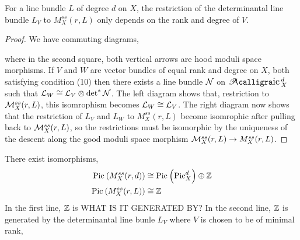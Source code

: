 \documentclass[12pt]{article}
\begin{document}
\begin{cor}
For a line bundle $L$ of degree $d$ on $X$, the restriction of the determinantal line bundle $L_V$ to $M_X^{ss}(r, L)$ only depends on the rank and degree of $V$.
\end{cor}

\begin{proof}
We have commuting diagrams,
\begin{center}
\quad {} \quad
{}
\end{center}
where in the second square, both vertical arrows are hood moduli space morphisms. If $V$ and $W$ are vector bundles of equal rank and degree on $X$, both satisfying condition (10) then there exists a line bundle $\mathcal{N}$ on $\cPic^d_X$ such that $\mathcal{L}_W \cong \mathcal{L}_V \otimes \det\nolimits^{*} \mathcal{N}$. The left diagram shows that, restriction to $\mathcal{M}_X^{ss}(r,L)$, this isomrophism becomes $\mathcal{L}_W \cong \mathcal{L}_V$. The right diagram now shows that the restriction of $L_V$ and $L_W$ to $M_X^{ss}(r, L)$ become isomrophic after pulling back to $\mathcal{M}_X^{ss}(r, L)$, so the restrictions must be isomorphic by the uniqueness of the descent along the good moduli space morphism $\mathcal{M}_X^{ss}(r, L) \to M_X^{ss}(r, L)$.
\end{proof}

\begin{theorem}
There exist isomorphisms,
\begin{align*}
\mathrm{Pic}^{} \left( M_X^{ss}(r,d) \right) & \cong \mathrm{Pic}^{} \left( \mathrm{Pic}_X^d \right) \oplus \mathbb{Z} 
\\
\mathrm{Pic}^{} \left( M_X^{ss}(r,L) \right) & \cong \mathbb{Z} 
\end{align*}
In the first line, $\mathbb{Z}$ is {\color{red} WHAT IS IT GENERATED BY?}
In the second line, $\mathbb{Z}$ is generated by the determinantal line bunle $L_V$ where $V$ is chosen to be of minimal rank,
\end{theorem}
\end{document}

